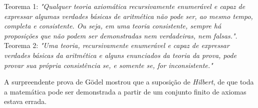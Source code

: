 \documentclass{article}
\date{17-nov-1930}
\begin{document}
\maketitle

\begin{multicols}{3}


    Teorema 1: \emph{"Qualquer teoria axiomática recursivamente enumerável e capaz de expressar algumas verdades básicas de aritmética não pode ser, ao mesmo tempo, completa e consistente. Ou seja, em uma teoria consistente, sempre há proposições que não podem ser demonstradas nem verdadeiras, nem falsas."}. Teorema 2: \emph{"Uma teoria, recursivamente enumerável e capaz de expressar verdades básicas da aritmética e alguns enunciados da teoria da prova, pode provar sua própria consistência se, e somente se, for inconsistente."}
    \begin{window}  
    A surpreendente prova de Gödel mostrou que a suposição de \emph{Hilbert}, de que toda a matemática pode ser demonstrada a partir de um conjunto finito de axiomas estava errada.
    \end{window}

    \closearticle


\end{multicols}
\end{document}
